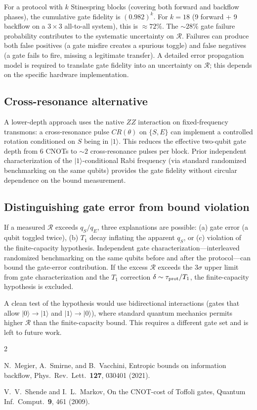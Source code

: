 \documentclass[aps,prl,onecolumn]{revtex4-2}
\begin{document}
For a protocol with $k$ Stinespring blocks (covering both forward and backflow phases), the cumulative gate fidelity is $(0.982)^k$. For $k=18$ (9 forward + 9 backflow on a $3 \times 3$ all-to-all system), this is $\approx 72\%$. The $\sim 28\%$ gate failure probability contributes to the systematic uncertainty on $\mathcal{R}$. Failures can produce both false positives (a gate misfire creates a spurious toggle) and false negatives (a gate fails to fire, missing a legitimate transfer). A detailed error propagation model is required to translate gate fidelity into an uncertainty on $\mathcal{R}$; this depends on the specific hardware implementation.

\subsection{Cross-resonance alternative}

A lower-depth approach uses the native $ZZ$ interaction on fixed-frequency transmons: a cross-resonance pulse $CR(\theta)$ on $\{S, E\}$ can implement a controlled rotation conditioned on $S$ being in $|1\rangle$. This reduces the effective two-qubit gate depth from 6 CNOTs to $\sim 2$ cross-resonance pulses per block. Prior independent characterization of the $|1\rangle$-conditional Rabi frequency (via standard randomized benchmarking on the same qubits) provides the gate fidelity without circular dependence on the bound measurement.

\subsection{Distinguishing gate error from bound violation}

If a measured $\mathcal{R}$ exceeds $q_S/q_E$, three explanations are possible: (a) gate error (a qubit toggled twice), (b) $T_1$ decay inflating the apparent $q_S$, or (c) violation of the finite-capacity hypothesis. Independent gate characterization---interleaved randomized benchmarking on the same qubits before and after the protocol---can bound the gate-error contribution. If the excess $\mathcal{R}$ exceeds the $3\sigma$ upper limit from gate characterization and the $T_1$ correction $\delta \sim \tau_{\rm prot}/T_1$, the finite-capacity hypothesis is excluded.

A clean test of the hypothesis would use bidirectional interactions (gates that allow $|0\rangle \to |1\rangle$ and $|1\rangle \to |0\rangle$), where standard quantum mechanics permits higher $\mathcal{R}$ than the finite-capacity bound. This requires a different gate set and is left to future work.

\begin{thebibliography}{2}

N.~Megier, A.~Smirne, and B.~Vacchini,
Entropic bounds on information backflow,
Phys.\ Rev.\ Lett.\ \textbf{127}, 030401 (2021).

V.~V.~Shende and I.~L.~Markov,
On the CNOT-cost of Toffoli gates,
Quantum Inf.\ Comput.\ \textbf{9}, 461 (2009).

\end{thebibliography}
\end{document}
